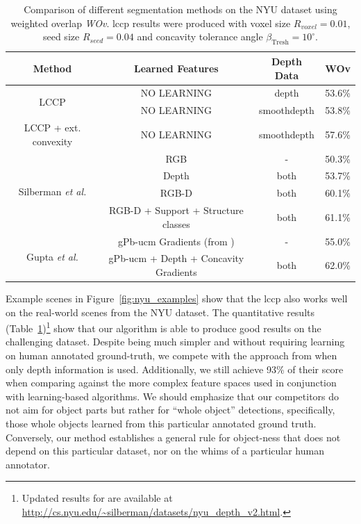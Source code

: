 \begin{table}
  \centering
  \begin{tabular}{c|c|c|c}
  Method & Learned Features & Depth Data  & WOv\\ \hline \hline
  \multirow{2}{*}{LCCP} & NO LEARNING & depth & 53.6\% \\ \cline{2-4}
                                           & NO LEARNING & smoothdepth & 53.8\% \\ \hline
  LCCP + ext. convexity & NO LEARNING & smoothdepth &  57.6\% \\ \hline \hline
  \multirow{4}{*}{Silberman \textit{et al.}\cite{Silberman:ECCV12}} & RGB  & - &  50.3\% \\ \cline{2-4}
                                           & Depth & both  & 53.7\% \\ \cline{2-4}
                                           & RGB-D & both  & 60.1\% \\ \cline{2-4}
                                           & RGB-D + Support + Structure classes & both & 61.1\% \\ \hline \hline
  \multirow{2}{*}{Gupta \textit{et al.}\cite{Gupta:CVPR2013}} & gPb-ucm Gradients (from \cite{Arbelaez:PAMI2011}) & - &  55.0\% \\ \cline{2-4}
                                           & gPb-ucm + Depth + Concavity Gradients & both & 62.0\% \\ \hline
  \end{tabular}
  \caption[Comparison of NYU Dataset Results]{Comparison of different segmentation methods on the NYU dataset using weighted overlap \textit{WOv}. \gls{lccp} results were produced with voxel size $R_{voxel} = 0.01$, seed size $R_{seed}=0.04$ and concavity tolerance angle $\beta_\text{Tresh}=10^\circ$.}
  \label{tab:res_lccp_nyu}
\end{table}

Example scenes in Figure~\ref{fig:nyu_examples} show that the \gls{lccp} also works well on the real-world scenes from the NYU dataset. The quantitative results (Table~\ref{tab:res_lccp_nyu})\footnote{Updated results for \cite{Silberman:ECCV12} are available at \url{http://cs.nyu.edu/~silberman/datasets/nyu_depth_v2.html}.} show that our algorithm is able to produce good results on the challenging dataset. Despite being much simpler and without requiring learning on human annotated ground-truth, we compete with the approach from \cite{Silberman:ECCV12} when only depth information is used. Additionally, we still achieve 93\% of their score when comparing against the more complex feature spaces used in conjunction with learning-based algorithms. We should emphasize that our competitors do not aim for object parts but rather for ``whole object'' detections, specifically, those whole objects learned from this particular annotated ground truth. Conversely, our method establishes a general rule for object-ness that does not depend on this particular dataset, nor on the whims of a particular human annotator.

